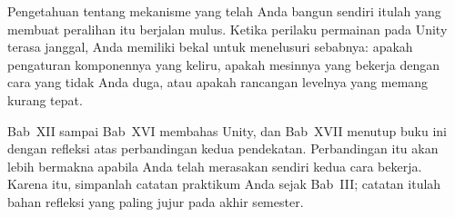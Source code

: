 Pengetahuan tentang mekanisme yang telah Anda bangun sendiri itulah yang
membuat peralihan itu berjalan mulus. Ketika perilaku permainan pada Unity
terasa janggal, Anda memiliki bekal untuk menelusuri sebabnya: apakah
pengaturan komponennya yang keliru, apakah mesinnya yang bekerja dengan cara
yang tidak Anda duga, atau apakah rancangan levelnya yang memang kurang tepat.

\begin{catatabox}
Bab~XII sampai Bab~XVI membahas Unity, dan Bab~XVII menutup buku ini dengan
refleksi atas perbandingan kedua pendekatan. Perbandingan itu akan lebih
bermakna apabila Anda telah merasakan sendiri kedua cara bekerja. Karena itu,
simpanlah catatan praktikum Anda sejak Bab~III; catatan itulah bahan refleksi
yang paling jujur pada akhir semester.
\end{catatabox}
